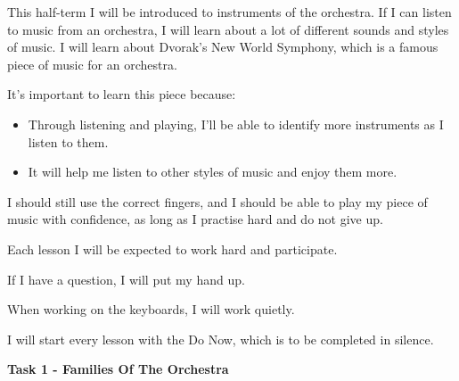 \documentclass{article}
\begin{document}
\vspace{1em}

\noindent This half-term I will be introduced to instruments of the orchestra. If I can listen to music from an orchestra, I will learn about a lot of different sounds and styles of music.
I will learn about Dvorak’s New World Symphony, which is a famous piece of music for an orchestra.


\vspace{1em}

\noindent It’s important to learn this piece because:

\vspace{2.5em}

\begin{itemize}[leftmargin=0em, itemsep=0pt, parsep=0pt, topsep=0pt]
    \item Through listening and playing, I’ll be able to identify more instruments as I listen to them.

    \item It will help me listen to other styles of music and enjoy them more.
\end{itemize}

\vspace{2.5em}
\par \noindent
I should still use the correct fingers, and I should be able to play my piece of music with confidence, as long as I practise hard and do not give up.

\vspace{2.5em}

\noindent Each lesson I will be expected to work hard and participate.\

\vspace{2.5em}

\noindent If I have a question, I will put my hand up.

\vspace{1em}
\noindent When working on the keyboards, I will work quietly.

\vspace{1em}
\noindent I will start every lesson with the Do Now, which is to be completed in silence.


\newpage
\begin{center}
    \fontsize{18}{22}\selectfont
    \textbf{Task 1 - Families Of The Orchestra}
\end{center}

\vspace{1em}

\setlength{\columnsep}{1.5em}
\end{document}
